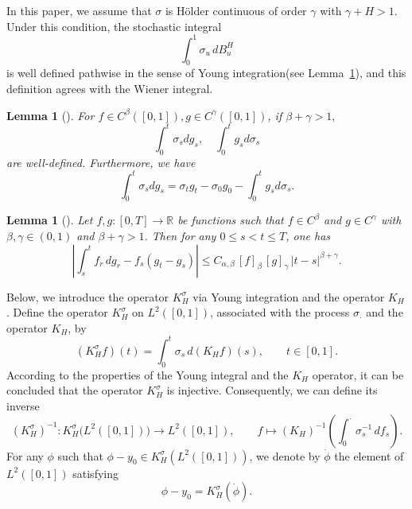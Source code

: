 \documentclass{article}
\newtheorem{lemma}[theorem]{Lemma}
\theoremstyle{definition}  %
\theoremstyle{plain}  %
\begin{document}
	
	
	In this paper, we assume that $\sigma$ is H\"older continuous of order $\gamma$ with $\gamma+H>1$. Under this condition, the stochastic integral
\[
\int_0^1 \sigma_u \, dB^H_u
\]
is well defined pathwise in the sense of Young integration(see Lemma~\ref{young}), and this definition agrees with the Wiener integral.
 
	\begin{lemma}[\cite{Young1936}]   \label{young}
		For $f\in C^\beta([0,1]), g\in C^\gamma([0,1])$, if $\beta+\gamma>1,$ 
		\begin{equation*}
			\int_0^t \sigma_s dg_s,\quad \int_0^t g_sd\sigma_s 
		\end{equation*}
		are well-defined. Furthermore, we have
		\begin{equation*}
			\int_0^t \sigma_s dg_s=\sigma_t g_t-\sigma_0 g_0-\int_0^t g_sd\sigma_s.
		\end{equation*}
	\end{lemma}
	
	\begin{lemma}[\cite{Young1936}] \label{young2}
Let $f,g:[0,T]\to \mathbb{R}$ be functions such that $f \in C^{\beta}$ 
and $g \in C^{\gamma}$ with $\beta,\gamma \in (0,1)$ and $\beta+\gamma>1$. 
Then  for any $0\leq s<t\leq T$, one has
\begin{equation}
	\left|\int_s^t f_r \, dg_r - f_s (g_t-g_s)\right|
   \leq C_{\alpha,\beta}\, [f]_{\beta}\,[g]_{\gamma}\, |t-s|^{\beta+\gamma}.\label{youngint}
\end{equation}
\end{lemma}

   Below, we introduce the operator \(K_H^\sigma\) via Young integration and the operator \(K_H\). 
Define the operator $K_H^\sigma$ on $L^2([0,1])$, associated with the process $\sigma_\cdot$ and the operator $K_H$, by
\begin{equation}
    (K_H^\sigma f)(t) = \int_0^t \sigma_s \, d(K_H f)(s), \qquad t \in [0,1]. \label{khsigma}
\end{equation}
According to the properties of the Young integral and the $K_H$ operator, it can be concluded that  
the operator $K_H^\sigma$ is injective.
Consequently, we can define its inverse
\[
    (K_H^\sigma)^{-1} : K_H^\sigma\bigl(L^2([0,1])\bigr) \to L^2([0,1]), 
    \qquad 
    f \mapsto (K_H)^{-1}\!\left(\int_0^\cdot \sigma_s^{-1} \, df_s\right).
\]
For any $\phi$ such that $\phi - y_0 \in K_H^\sigma(L^2([0,1]))$, we denote by $\dot{\phi}$ the element of $L^2([0,1])$ satisfying
\begin{equation}
    \phi - y_0 = K_H^\sigma(\dot{\phi}). \label{khs}
\end{equation}
\end{document}
